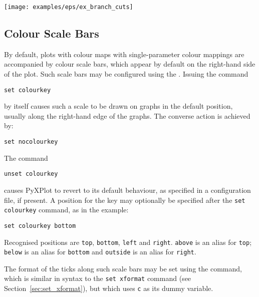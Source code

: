 \centerline{\texttt{[image: examples/eps/ex\_branch\_cuts]}}

\subsection{Colour Scale Bars}

By default, plots with colour maps with single-parameter colour mappings are
accompanied by colour scale bars, which appear by default on the right-hand
side of the plot. Such scale bars may be configured using the . Issuing the command

\begin{verbatim}
set colourkey
\end{verbatim}

\noindent by itself causes such a scale to be drawn on graphs in the default
position, usually along the right-hand edge of the graphs. The converse action
is achieved by:

\begin{verbatim}
set nocolourkey
\end{verbatim}

\noindent The command

\begin{verbatim}
unset colourkey
\end{verbatim}

\noindent causes PyXPlot to revert to its default behaviour, as specified in a
configuration file, if present. A position for the key may optionally be
specified after the {\tt set colourkey} command, as in the example:

\begin{verbatim}
set colourkey bottom
\end{verbatim}

Recognised positions are {\tt top}, {\tt bottom}, {\tt left} and {\tt right}.
{\tt above} is an alias for {\tt top}; {\tt below} is an alias for {\tt bottom}
and {\tt outside} is an alias for {\tt right}.

The format of the ticks along such scale bars may be set using the  command, which is similar in syntax to the {\tt set xformat} command
(see Section~\ref{sec:set_xformat}), but which uses {\tt c} as its dummy
variable.

